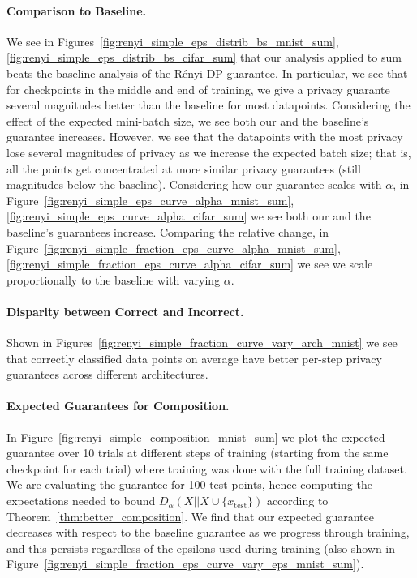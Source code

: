 \paragraph{Comparison to Baseline.} We see in Figures~\ref{fig:renyi_simple_eps_distrib_bs_mnist_sum}, \ref{fig:renyi_simple_eps_distrib_bs_cifar_sum} that our analysis applied to sum beats the baseline analysis of the R\'enyi-DP guarantee. In particular, we see that for checkpoints in the middle and end of training, we give a privacy guarante several magnitudes better than the baseline for most datapoints. Considering the effect of the expected mini-batch size, we see both our and the baseline's guarantee increases. However, we see that the datapoints with the most privacy lose several magnitudes of privacy as we increase the expected batch size; that is, all the points get concentrated at more similar privacy guarantees (still magnitudes below the baseline). Considering how our guarantee scales with $\alpha$,  in Figure~\ref{fig:renyi_simple_eps_curve_alpha_mnist_sum},\ref{fig:renyi_simple_eps_curve_alpha_cifar_sum} we see both our and the baseline's guarantees increase. Comparing the relative change, in Figure~\ref{fig:renyi_simple_fraction_eps_curve_alpha_mnist_sum},\ref{fig:renyi_simple_fraction_eps_curve_alpha_cifar_sum} we see we scale proportionally to the baseline with varying $\alpha$.




\paragraph{Disparity between Correct and Incorrect.}  Shown in Figures~\ref{fig:renyi_simple_fraction_curve_vary_arch_mnist} we see that correctly classified data points on average have better per-step privacy guarantees across different architectures.






\paragraph{Expected Guarantees for Composition.} In Figure~\ref{fig:renyi_simple_composition_mnist_sum} we plot the expected guarantee over 10 trials at different steps of training (starting from the same checkpoint for each trial) where training was done with the full training dataset. We are evaluating the guarantee for 100 test points, hence computing the expectations needed to bound $D_{\alpha}(X||X\cup \{x_{\text{test}}\})$ according to Theorem~\ref{thm:better_composition}. We find that our expected guarantee decreases with respect to the baseline guarantee as we progress through training, and this persists regardless of the epsilons used during training (also shown in Figure~\ref{fig:renyi_simple_fraction_eps_curve_vary_eps_mnist_sum}). 

